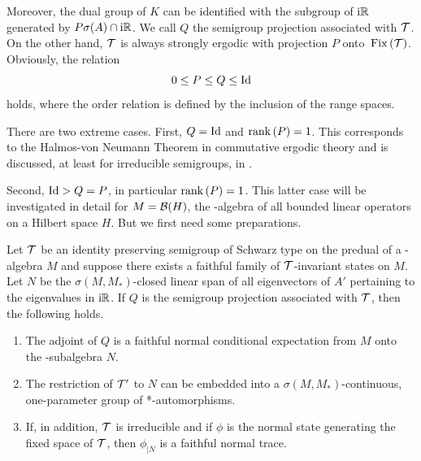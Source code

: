 Moreover, the dual group of\/ $K$ can be identified with the subgroup of\/ $\mathrm{i}\mathbb{R}$ generated by 
$P\sigma(A) \cap \mathrm{i}  \mathbb{R} $.
We call $Q$ the semigroup projection associated with $\mathcal{T}$.
On the other hand, $\mathcal{T}$ is always strongly ergodic with projection $P$ onto $\mathop{}\mathrm{Fix}\left(\mathcal{T}\right)$.
Obviously, the relation
\[
    0 \leq P \leq Q \leq \Id 
\]
holds, where the order relation is defined by the inclusion of the range spaces.

There are two extreme cases.
First, $Q = \operatorname{Id}$ and $ \mathop{}\!\mathrm{rank}\, (P) = 1$.
This corresponds to the Halmos-von Neumann Theorem in commutative ergodic theory and is discussed, at least for irreducible semigroups, in \textcite{olesen:1980}.

Second, $\operatorname{Id} > Q = P$, in particular $\mathop{}\!\mathrm{rank}\,(P) = 1$.
This latter case will be investigated in detail for $M = \mathcal{B}(H) $, the \WA-algebra of all bounded linear operators on a Hilbert space $H$.
But we first need some preparations.
\begin{theorem}\label{thm:d4-3.5}
Let $\mathcal{T}$ be an identity preserving semigroup of Schwarz type on the predual of a \WA-algebra $M$ and suppose there exists a faithful family of\/ $\mathcal{T}$-invariant states on $M$.
Let $N$ be the $\sigma(M,M_{*})$-closed linear span of all eigenvectors of\/ $A'$ pertaining to the eigenvalues in $\mathrm{i}\mathbb{R}$.
If\/ $Q$ is the semigroup projection associated with $\mathcal{T}$, then the following holds.
\begin{enumerate}[\upshape (i)]
\item 
The adjoint of\/ $Q$ is a faithful normal conditional expectation from $M$ onto the \WA-subalgebra $N$.

\item 
The restriction of\/ $\mathcal{T}'$ to $N$ can be embedded into a $\sigma(M,M_{*})$-continuous, one-parameter group of *-automorphisms.

\item 
If, in addition, $\mathcal{T}$ is irreducible and if\/ $\phi$ is the normal state generating the fixed space of\/ $\mathcal{T}$, then $\phi_{\vert N}$ is a faithful normal trace.

\end{enumerate}
\end{theorem}
